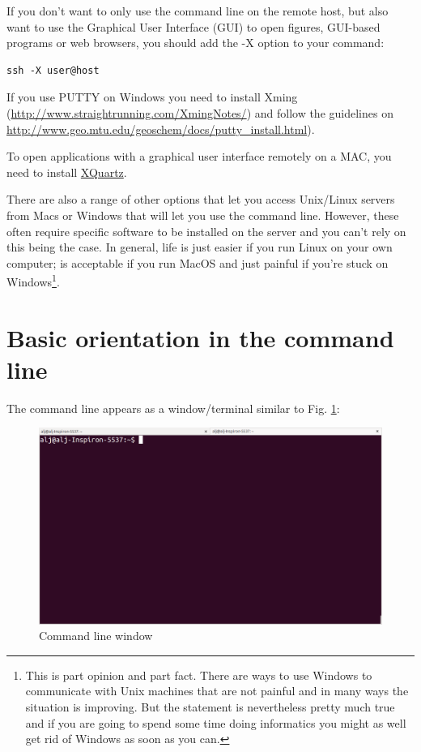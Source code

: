 \documentclass[11pt]{article}
\begin{document}
If you don't want to only use the command line on the remote host, but
also want to use the Graphical User Interface (GUI) to open figures,
GUI-based programs or web browsers, you should add the -X option to
your command:

\begin{verbatim}
ssh -X user@host
\end{verbatim}

If you use PUTTY on Windows you need to install Xming
(\url{http://www.straightrunning.com/XmingNotes/}) and follow the guidelines
on \url{http://www.geo.mtu.edu/geoschem/docs/putty_install.html}).

To open applications with a graphical user interface remotely on a
MAC, you need to install \href{http://xquartz.macosforge.org/landing/}{XQuartz}.

There are also a range of other options that let you access Unix/Linux
servers from Macs or Windows that will let you use the command line. However,
these often require specific software to be installed on the server and you
can't rely on this being the case. In general, life is just easier if you run
Linux on your own computer; is acceptable if you run MacOS and just painful
if you're stuck on Windows\footnote{This is part opinion and part fact. There are ways to use Windows to
communicate with Unix machines that are not painful and in many ways the
situation is improving. But the statement is nevertheless pretty much true
and if you are going to spend some time doing informatics you might as well
get rid of Windows as soon as you can.}.

\section{Basic orientation in the command line}
\label{sec:orgheadline15}

The command line appears as a window/terminal similar to
Fig. \ref{fig:orgparagraph1}:

\begin{figure}[htb]
\centering
\includegraphics[width=14cm]{Terminal.png}
\caption{\label{fig:orgparagraph1}
Command line window}
\end{figure}
\end{document}
